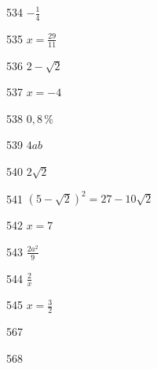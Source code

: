 \begin{Vastaus}{534}
				$-\frac{1}{4}$
	
\end{Vastaus}
\begin{Vastaus}{535}
				$x=\frac{29}{11}$
	
\end{Vastaus}
\begin{Vastaus}{536}
				$2-\sqrt{2}$
	
\end{Vastaus}
\begin{Vastaus}{537}
				$x=-4$
	
\end{Vastaus}
\begin{Vastaus}{538}
	$0,8\,\%$
	
\end{Vastaus}
\begin{Vastaus}{539}
				$4ab$
	
\end{Vastaus}
\begin{Vastaus}{540}
				$2\sqrt{2}$
	
\end{Vastaus}
\begin{Vastaus}{541}
				$(5-\sqrt{2})^2=27-10\sqrt{2}$ %
	
\end{Vastaus}
\begin{Vastaus}{542}
				$x=7$
	
\end{Vastaus}
\begin{Vastaus}{543}
				$\frac{2a^2}{9}$
	
\end{Vastaus}
\begin{Vastaus}{544}
				$\frac{2}{x}$
	
\end{Vastaus}
\begin{Vastaus}{545}
				$x=\frac{3}{2}$
	
\end{Vastaus}
\begin{Vastaus}{567}
    
\end{Vastaus}
\begin{Vastaus}{568}
	
\end{Vastaus}
